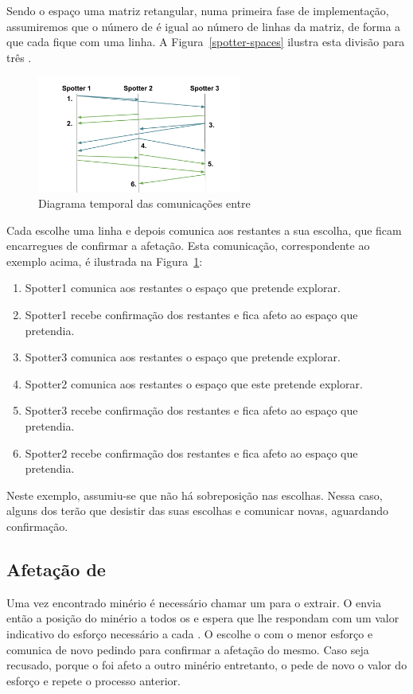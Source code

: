 \documentclass[12pt]{report}
\begin{document}
Sendo o espaço uma matriz retangular, numa primeira fase de implementação, assumiremos que o número de \spotters é igual ao número de linhas da matriz, de forma a que cada \spotter fique com uma linha. A Figura~\ref{spotter-spaces} ilustra esta divisão para três \spotters.

\begin{figure}[h]
  \centering
    \includegraphics[width=0.6\textwidth]{spotter-agreement}
  \caption{\small{Diagrama temporal das comunicações entre \spotters}}
  \label{spotter-agreement}
\end{figure}  

Cada \spotter escolhe uma linha e depois comunica aos restantes a sua escolha, que ficam encarregues de confirmar a afetação. Esta comunicação, correspondente ao exemplo acima, é ilustrada na Figura~\ref{spotter-agreement}:
\begin{enumerate}
	\item Spotter1 comunica aos restantes o espaço que pretende explorar.
    \item Spotter1 recebe confirmação dos restantes e fica afeto ao espaço que pretendia.
    \item Spotter3 comunica aos restantes o espaço que pretende explorar.
    \item Spotter2 comunica aos restantes o espaço que este pretende explorar.
    \item Spotter3 recebe confirmação dos restantes e fica afeto ao espaço que pretendia.
    \item Spotter2 recebe confirmação dos restantes e fica afeto ao espaço que pretendia.
\end{enumerate}

Neste exemplo, assumiu-se que não há sobreposição nas escolhas. Nessa caso, alguns dos \spotters terão que desistir das suas escolhas e comunicar novas, aguardando confirmação.

\FloatBarrier
\newpage
\subsection{Afetação de \producers}
Uma vez encontrado minério é necessário chamar um \producer para o extrair. O \spotter envia então a posição do 
minério a todos os \producers e espera que lhe respondam com um valor indicativo do esforço necessário a cada \producer.
O \spotter escolhe o \producer com o menor esforço e comunica de novo pedindo para confirmar a afetação do mesmo.
Caso seja recusado, porque o \producer foi afeto a outro minério entretanto, o \spotter pede de novo o valor do esforço
e repete o processo anterior.
\end{document}
